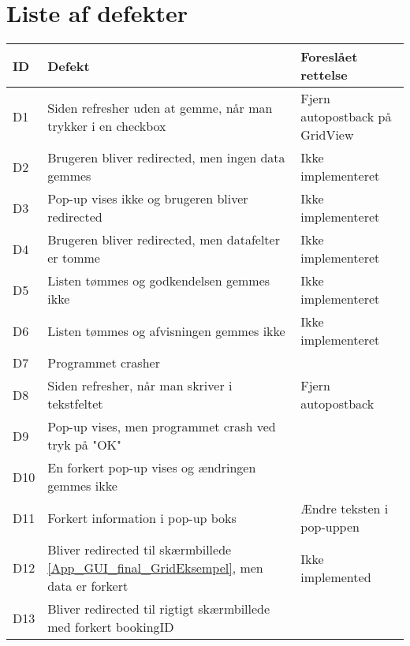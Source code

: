 \section{Liste af defekter}
\label{App_Test_Defects}
\begin{centering}
\begin{longtable}{| p{0.5 cm} | p{10 cm} | p{5 cm} |}
\hline
\textbf{ID} & \textbf{Defekt} & \textbf{Foreslået rettelse}\\
\hline
D1 & Siden refresher uden at gemme, når man trykker i en checkbox & Fjern autopostback på GridView\\
\hline
D2 & Brugeren bliver redirected, men ingen data gemmes & Ikke implementeret\\
\hline
D3 & Pop-up vises ikke og brugeren bliver redirected & Ikke implementeret\\
\hline
D4 & Brugeren bliver redirected, men datafelter er tomme & Ikke implementeret\\
\hline
D5 & Listen tømmes og godkendelsen gemmes ikke & Ikke implementeret\\
\hline
D6 & Listen tømmes og afvisningen gemmes ikke & Ikke implementeret \\
\hline
D7 & Programmet crasher & \\
\hline
D8 & Siden refresher, når man skriver i tekstfeltet & Fjern autopostback \\
\hline
D9 & Pop-up vises, men programmet crash ved tryk på "OK" & \\
\hline
D10 & En forkert pop-up vises og ændringen gemmes ikke & \\
\hline
D11 & Forkert information i pop-up boks & Ændre teksten i pop-uppen \\
\hline
D12 & Bliver redirected til skærmbillede \ref{App_GUI_final_GridEksempel}, men data er forkert & Ikke implemented\\
\hline
D13 & Bliver redirected til rigtigt skærmbillede med forkert bookingID & \\
\hline
\end{longtable}
\end{centering}